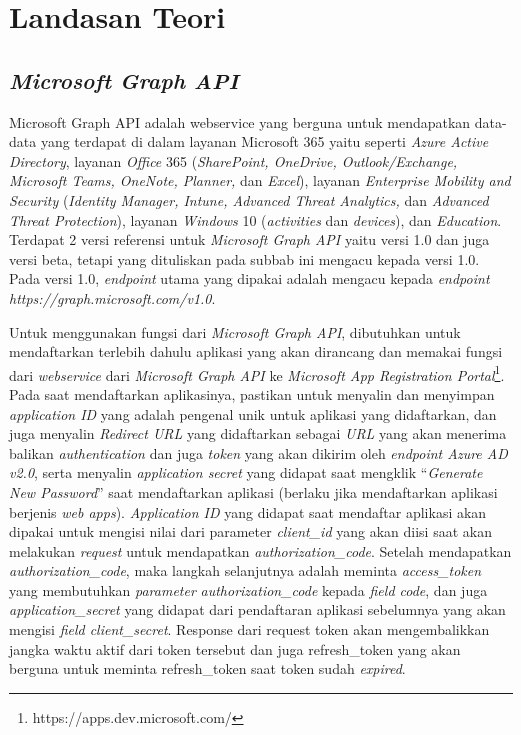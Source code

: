 \chapter{Landasan Teori}
\label{chap:teori}

\section{\textit{Microsoft Graph API}}
\label{sec:microsoftgraph}
Microsoft Graph API adalah webservice yang berguna untuk mendapatkan data-data yang terdapat di dalam layanan Microsoft 365 yaitu seperti \textit{Azure Active Directory}, layanan \textit{Office} 365 (\textit{SharePoint, OneDrive, Outlook/Exchange, Microsoft Teams, OneNote, Planner,} dan \textit{Excel}), layanan \textit{Enterprise Mobility and Security} (\textit{Identity Manager, Intune, Advanced Threat Analytics,} dan \textit{Advanced Threat Protection}), layanan \textit{Windows} 10 (\textit{activities} dan \textit{devices}), dan \textit{Education}. Terdapat 2 versi referensi untuk \textit{Microsoft Graph API} yaitu versi 1.0 dan juga versi beta, tetapi yang dituliskan pada subbab ini mengacu kepada versi 1.0. \cite{microsoft} Pada versi 1.0, \textit{endpoint} utama yang dipakai adalah mengacu kepada \textit{endpoint} \textit{https://graph.microsoft.com/v1.0}. 

Untuk menggunakan fungsi dari \textit{Microsoft Graph API}, dibutuhkan untuk mendaftarkan terlebih dahulu aplikasi yang akan dirancang dan memakai fungsi dari \textit{webservice} dari \textit{Microsoft Graph API} ke \textit{Microsoft App Registration Portal}\footnote{https://apps.dev.microsoft.com/}. Pada saat mendaftarkan aplikasinya, pastikan untuk menyalin dan menyimpan \textit{application ID} yang adalah pengenal unik untuk aplikasi yang didaftarkan, dan juga menyalin \textit{Redirect URL} yang didaftarkan sebagai \textit{URL} yang akan menerima balikan \textit{authentication} dan juga \textit{token} yang akan dikirim oleh \textit{endpoint Azure AD v2.0}, serta menyalin \textit{application secret} yang didapat saat mengklik ``\textit{Generate New Password}'' saat mendaftarkan aplikasi (berlaku jika mendaftarkan aplikasi berjenis \textit{web apps}). \textit{Application ID} yang didapat saat mendaftar aplikasi akan dipakai untuk mengisi nilai dari parameter \textit{client\_id} yang akan diisi saat akan melakukan \textit{request} untuk mendapatkan \textit{authorization\_code}. Setelah mendapatkan \textit{authorization\_code}, maka langkah selanjutnya adalah meminta \textit{access\_token} yang membutuhkan \textit{parameter} \textit{authorization\_code} kepada \textit{field code}, dan juga \textit{application\_secret} yang didapat dari pendaftaran aplikasi sebelumnya yang akan mengisi \textit{field client\_secret}. Response dari request token akan mengembalikkan jangka waktu aktif dari token tersebut dan juga refresh\_token yang akan berguna untuk meminta refresh\_token saat token sudah \textit{expired}.

